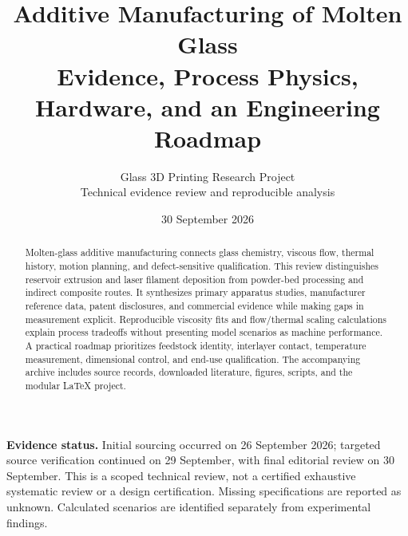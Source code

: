 \documentclass[11pt,a4paper]{article}
\title{Additive Manufacturing of Molten Glass\\\large Evidence, Process Physics, Hardware, and an Engineering Roadmap}
\author{Glass 3D Printing Research Project\\\small Technical evidence review and reproducible analysis}
\date{30 September 2026}
\begin{document}
\maketitle
\begin{abstract}
Molten-glass additive manufacturing connects glass chemistry, viscous flow, thermal history, motion planning, and defect-sensitive qualification. This review distinguishes reservoir extrusion and laser filament deposition from powder-bed processing and indirect composite routes. It synthesizes primary apparatus studies, manufacturer reference data, patent disclosures, and commercial evidence while making gaps in measurement explicit. Reproducible viscosity fits and flow/thermal scaling calculations explain process tradeoffs without presenting model scenarios as machine performance. A practical roadmap prioritizes feedstock identity, interlayer contact, temperature measurement, dimensional control, and end-use qualification. The accompanying archive includes source records, downloaded literature, figures, scripts, and the modular LaTeX project.
\end{abstract}
\textbf{Evidence status.} Initial sourcing occurred on 26 September 2026; targeted source verification continued on 29 September, with final editorial review on 30 September. This is a scoped technical review, not a certified exhaustive systematic review or a design certification. Missing specifications are reported as unknown. Calculated scenarios are identified separately from experimental findings.
\tableofcontents
\clearpage








\clearpage
\begingroup
\RaggedRight


\endgroup
\end{document}
